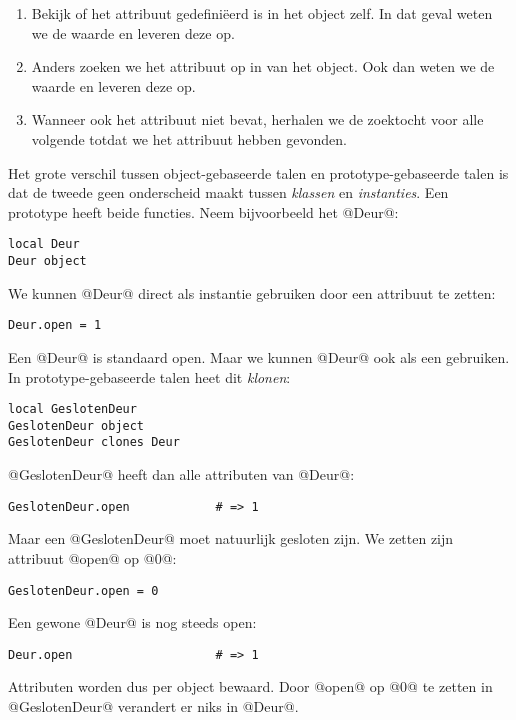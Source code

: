 \begin{enumerate}
  \item Bekijk of het attribuut gedefiniëerd is in het object zelf. In dat geval weten we de waarde en leveren deze op.
  \item Anders zoeken we het attribuut op in   van het object. Ook dan weten we de waarde en leveren deze op.
  \item Wanneer ook   het attribuut niet bevat, herhalen we de zoektocht voor alle volgende   totdat we het attribuut hebben gevonden.
\end{enumerate}


Het grote verschil tussen object-gebaseerde talen en prototype-gebaseerde talen is  dat de tweede geen onderscheid maakt tussen \emph{klassen} en \emph{instanties}. Een prototype heeft beide functies. Neem bijvoorbeeld het   @Deur@:
\begin{lstlisting}[name=deuren]
local Deur
Deur object
\end{lstlisting}
We kunnen @Deur@ direct als instantie gebruiken door een attribuut te zetten:
\begin{lstlisting}[name=deuren]
Deur.open = 1
\end{lstlisting}
Een @Deur@ is standaard open. Maar we kunnen @Deur@ ook als een   gebruiken. In  prototype-gebaseerde talen heet dit \emph{klonen}:
\begin{lstlisting}[name=deuren]
local GeslotenDeur
GeslotenDeur object
GeslotenDeur clones Deur
\end{lstlisting}
@GeslotenDeur@ heeft dan alle attributen van @Deur@:
\begin{lstlisting}[name=deuren]
GeslotenDeur.open            # => 1
\end{lstlisting}
Maar een @GeslotenDeur@ moet natuurlijk gesloten zijn. We zetten zijn attribuut @open@ op @0@:
\begin{lstlisting}[name=deuren]
GeslotenDeur.open = 0
\end{lstlisting}
Een gewone @Deur@ is nog steeds open:
\begin{lstlisting}[name=deuren]
Deur.open                    # => 1
\end{lstlisting}
Attributen worden dus per object bewaard. Door @open@ op @0@ te zetten in @GeslotenDeur@ verandert er niks in @Deur@.

